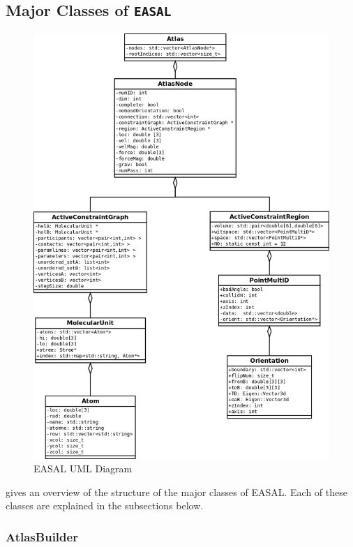\subsection{Major Classes of \texttt{EASAL}}
\label{sec:classes}
\begin{figure}[h]
\centering
\includegraphics[scale=0.3] {fig/EASAL_UML.png}
\caption{EASAL UML Diagram}
\label{UML}
\end{figure}


 gives an overview of the structure of the major classes of EASAL.
Each of these classes are explained in the subsections below.

\subsubsection{AtlasBuilder} 

